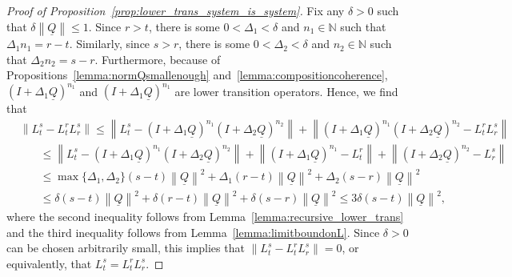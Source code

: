 \documentclass[10pt,a4paper]{paper}
\theoremstyle{definition}
\newcommand{\nats}{\mathbb{N}}
\newcommand{\lrate}{\underline{Q}}
\newcommand{\norm}[1]{\left\lVert #1 \right\rVert}
\begin{document}
\begin{proof}[Proof of Proposition~\ref{prop:lower_trans_system_is_system}]
Fix any $\delta>0$ such that $\delta\norm{\lrate}\leq1$. Since $r>t$, there is some $0<\Delta_1<\delta$ and $n_1\in\nats$ such that $\Delta_1 n_1=r-t$. Similarly, since $s>r$, there is some $0<\Delta_2<\delta$ and $n_2\in\nats$ such that $\Delta_2 n_2=s-r$. Furthermore, because of Propositions~\ref{lemma:normQsmallenough} and~\ref{lemma:compositioncoherence}, $(I+\Delta_1\lrate)^{n_1}$ and $(I+\Delta_1\lrate)^{n_1}$ are lower transition operators. Hence, we find that
\begin{align*}
&\norm{L_t^s-L_t^rL_r^s}
\leq
\norm{L_t^s-(I+\Delta_1\lrate)^{n_1}(I+\Delta_2\lrate)^{n_2}}
+
\norm{(I+\Delta_1\lrate)^{n_1}(I+\Delta_2\lrate)^{n_2}-L_t^rL_r^s}\\
&~~~~~~~~\leq
\norm{L_t^s-(I+\Delta_1\lrate)^{n_1}(I+\Delta_2\lrate)^{n_2}}
+
\norm{(I+\Delta_1\lrate)^{n_1}-L_t^r}
+
\norm{(I+\Delta_2\lrate)^{n_2}-L_r^s}\\
&~~~~~~~~\leq
\max\{\Delta_1,\Delta_2\}(s-t)\norm{\lrate}^2
+
\Delta_1(r-t)\norm{\lrate}^2
+
\Delta_2(s-r)\norm{\lrate}^2\\
&~~~~~~~~\leq
\delta(s-t)\norm{\lrate}^2
+
\delta(r-t)\norm{\lrate}^2
+
\delta(s-r)\norm{\lrate}^2
\leq
3\delta(s-t)\norm{\lrate}^2,
\end{align*}
where the second inequality follows from Lemma~\ref{lemma:recursive_lower_trans} and the third inequality follows from Lemma~\ref{lemma:limitboundonL}. Since $\delta>0$ can be chosen arbitrarily small, this implies that $\norm{L_t^s-L_t^rL_r^s}=0$, or equivalently, that $L_t^s=L_t^rL_r^s$.

\end{proof}
\end{document}
